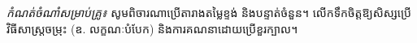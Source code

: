 
\vfill
\noindent\textit{កំណត់ចំណាំសម្រាប់គ្រូ៖} សូមពិចារណាប្រើតារាងតម្លៃខ្ទង់ និងបន្ទាត់ចំនួន។ លើកទឹកចិត្តឱ្យសិស្សប្រើវិធីសាស្ត្រចម្រុះ (ឧ. លក្ខណៈបំបែក) និងការគណនាដោយប្រើខួរក្បាល។


